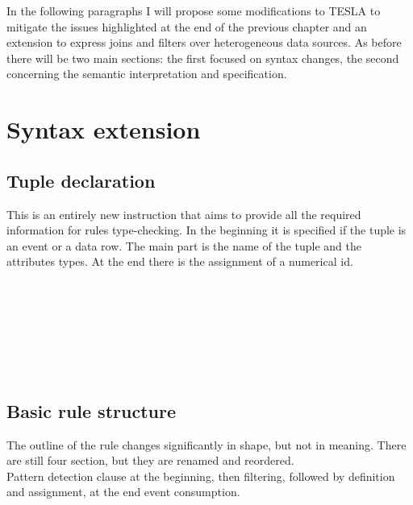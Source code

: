 In the following paragraphs I will propose some modifications to TESLA to mitigate the issues highlighted at the end of the previous chapter and an extension to express joins and filters over heterogeneous data sources. As before there will be two main sections: the first focused on syntax changes, the second concerning the semantic interpretation and specification.

\section{Syntax extension}

\subsection{Tuple declaration}
This is an entirely new instruction that aims to provide all the required information for rules type-checking. In the beginning it is specified if the tuple is an event or a data row. The main part is the name of the tuple and the attributes types. At the end there is the assignment of a numerical id.
\begin{bnf*}
\\
\\
\\
\\
\\
\\
\end{bnf*}

\subsection{Basic rule structure}
The outline of the rule changes significantly in shape, but not in meaning. There are still four section, but they are renamed and reordered.\\
Pattern detection clause at the beginning, then filtering, followed by definition and assignment, at the end event consumption. 
\begin{bnf*}
\end{bnf*}

